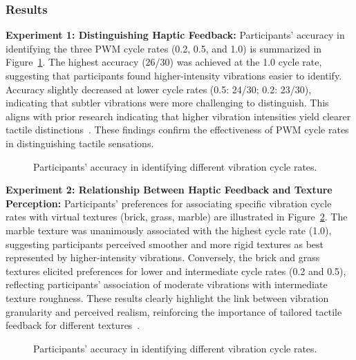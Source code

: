 \documentclass[graybox]{svmult}
\begin{document}
\subsubsection{Results}
\textbf{Experiment 1: Distinguishing Haptic Feedback: }
Participants' accuracy in identifying the three PWM cycle rates (0.2, 0.5, and 1.0) is summarized in Figure~\ref{fig:ex1_results}. The highest accuracy (26/30) was achieved at the 1.0 cycle rate, suggesting that participants found higher-intensity vibrations easier to identify. Accuracy slightly decreased at lower cycle rates (0.5: 24/30; 0.2: 23/30), indicating that subtler vibrations were more challenging to distinguish. This aligns with prior research indicating that higher vibration intensities yield clearer tactile distinctions~\cite{strohmeier2017generating,bensmaia2003vibrations}. These findings confirm the effectiveness of PWM cycle rates in distinguishing tactile sensations.
\begin{figure}\centering
	
	\caption{Participants' accuracy in identifying different vibration cycle rates.}\label{fig:ex1_results}
\end{figure}

\textbf{Experiment 2: Relationship Between Haptic Feedback and Texture Perception: }
Participants' preferences for associating specific vibration cycle rates with virtual textures (brick, grass, marble) are illustrated in Figure~\ref{fig:ex2_results}. The marble texture was unanimously associated with the highest cycle rate (1.0), suggesting participants perceived smoother and more rigid textures as best represented by higher-intensity vibrations. Conversely, the brick and grass textures elicited preferences for lower and intermediate cycle rates (0.2 and 0.5), reflecting participants' association of moderate vibrations with intermediate texture roughness. These results clearly highlight the link between vibration granularity and perceived realism, reinforcing the importance of tailored tactile feedback for different textures~\cite{otake2022vibrotactile}.
\begin{figure}[H]
	\centering
	
	\caption{Participants' accuracy in identifying different vibration cycle rates.}\label{fig:ex2_results}
\end{figure}
\end{document}
